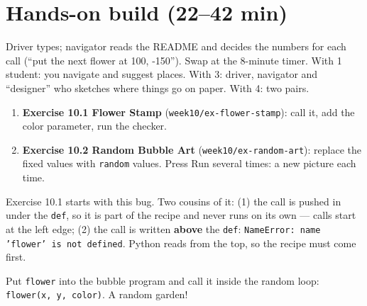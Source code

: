 \section{Hands-on build (22--42 min)}
\begin{pairroles}
Driver types; navigator reads the README and decides the numbers for each call (\enquote{put the next flower at 100, -150}). Swap at the 8-minute timer.
With 1 student: you navigate and suggest places. With 3: driver, navigator and \enquote{designer} who sketches where things go on paper. With 4: two pairs.
\end{pairroles}
\begin{enumerate}[leftmargin=1.4em,itemsep=2pt]
  \item \textbf{Exercise 10.1 Flower Stamp} (\texttt{week10/ex-flower-stamp}): call it, add the color parameter, run the checker.
  \item \textbf{Exercise 10.2 Random Bubble Art} (\texttt{week10/ex-random-art}): replace the fixed values with \texttt{random} values. Press Run several times: a new picture each time.
\end{enumerate}
\begin{bughunt}
Exercise 10.1 starts with this bug. Two cousins of it: (1) the call is pushed in under the \texttt{def}, so it is part of the recipe and never runs on its own --- calls start at the left edge; (2) the call is written \textbf{above} the \texttt{def}: \texttt{NameError: name 'flower' is not defined}. Python reads from the top, so the recipe must come first.
\end{bughunt}
\begin{freebuild}
Put \texttt{flower} into the bubble program and call it inside the random loop: \texttt{flower(x, y, color)}. A random garden!
\end{freebuild}

